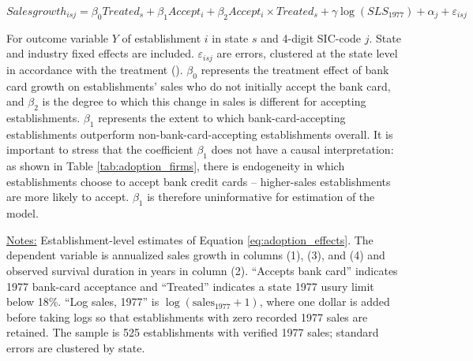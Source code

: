 \documentclass[12pt,english]{article}
\begin{document}
\begin{equation}\label{eq:adoption_effects}
Salesgrowth_{isj} = \beta_0 Treated_s + \beta_1 Accept_i + \beta_2 Accept_i \times Treated_s + \gamma \log(SLS_{1977}) + \alpha_j + \varepsilon_{isj}
\end{equation}

For outcome variable $Y$ of establishment $i$ in state $s$ and 4-digit SIC-code $j$. State and industry fixed effects are included. $\varepsilon_{isj}$ are errors, clustered at the state level in accordance with the treatment (\cite{abadie_when_2017}). $\beta_0$ represents the treatment effect of bank card growth on establishments' sales who do not initially accept the bank card, and $\beta_2$ is the degree to which this change in sales is different for accepting establishments.  $\beta_1$ represents the extent to which bank-card-accepting establishments outperform non-bank-card-accepting establishments overall. It is important to stress that the coefficient $\beta_1$ does not have a causal interpretation: as shown in Table \ref{tab:adoption_firms}, there is endogeneity in which establishments choose to accept bank credit cards -- higher-sales establishments are more likely to accept. $\beta_1$ is therefore uninformative for estimation of the model. 

\begin{table}[!ht]
\caption{Effects of Bank Card Expansion on Adopting Establishments}\label{tab:adoption_effects}



\noindent \small \uline{Notes:} Establishment-level estimates of Equation \ref{eq:adoption_effects}. The dependent variable is annualized sales growth in columns (1), (3), and (4) and observed survival duration in years in column (2). ``Accepts bank card'' indicates 1977 bank-card acceptance and ``Treated'' indicates a state 1977 usury limit below 18\%. ``Log sales, 1977'' is $\log(\text{sales}_{1977}+1)$, where one dollar is added before taking logs so that establishments with zero recorded 1977 sales are retained. The sample is 525 establishments with verified 1977 sales; standard errors are clustered by state.
\end{table}
\end{document}
